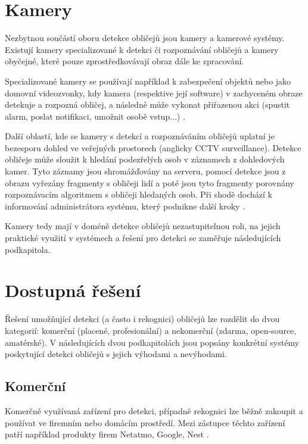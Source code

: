 \section{Kamery}
Nezbytnou součástí oboru detekce obličejů jsou kamery a kamerové systémy.
Existují kamery specializované k detekci či rozpoznávání obličejů 
a kamery obyčejné, které pouze zprostředkovávají obraz dále ke zpracování.

Specializované kamery se používají například k zabezpečení objektů nebo
jako domovní videozvonky, kdy kamera (respektive její software) v zachyceném
obraze detekuje a rozpozná obličej, a následně může vykonat přiřazenou akci 
(spustit alarm, poslat notifikaci, umožnit osobě vstup...) \cite{securityCamsWeb}.

Další oblastí, kde se kamery s detekcí a rozpoznáváním obličejů uplatní je
bezesporu dohled ve veřejných prostorech (anglicky CCTV surveillance). 
Detekce obličeje může sloužit k hledání podezřelých osob v záznamech z dohledových
kamer. Tyto záznamy jsou shromážďovány na serveru, pomocí detekce jsou
z obrazu vyřezány fragmenty s obličeji lidí a poté jsou tyto fragmenty
porovnány rozpoznávacím algoritmem s obličeji hledaných osob. Při shodě
dochází k informování administrátora systému, který podnikne další kroky 
\cite{suspectIdentification}. 

Kamery tedy mají v doméně detekce obličejů nezastupitelnou roli, na 
jejich praktické využití v systémech a řešení pro detekci se zaměřuje následujících
podkapitola.

\section{Dostupná řešení}
Řešení umožňující detekci (a často i rekognici) obličejů lze rozdělit do dvou kategorií: 
komerční (placené, profesionální) a nekomerční (zdarma, open-source, amatérské).
V následujících dvou podkapitolách jsou popsány konkrétní systémy poskytující
detekci obličejů s jejich výhodami a nevýhodami.

\subsection*{Komerční}
Komerčně využívaná zařízení pro detekci, případně rekognici lze běžně zakoupit 
a používat ve firemním nebo domácím prostředí. Mezi zástupce těchto zařízení
patří například produkty firem Netatmo, Google, Nest \cite{securityCamsWeb2}.

